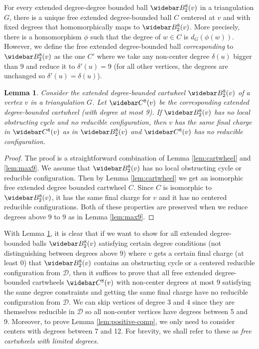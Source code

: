 \documentclass[10pt,a4paper]{article}
\newtheorem{lem}[thm]{Lemma}
\renewcommand{\bar}{\widebar}
\def\cD{{\mathcal D}}
\def\showlabel#1{}
\begin{document}
For every extended degree-degree bounded ball $\bar B^8_2(v)$ in a triangulation $G$, there is a unique free extended degree-bounded ball $C$ centered at $v$ and with fixed degrees that homomorphically maps to $\bar B^8_2(v)$. More precisely, there is a homomorphism $\phi$ such that the degree of $w\in C$ is $d_G(\phi(w))$. However, we define the free extended degree-bounded ball \emph{corresponding} to $\bar B^8_2(v)$ as the one $C'$ where we take any non-center degree $\delta(u)$ bigger than 9 and reduce it to $\delta'(u)=9$ (for all other vertices, the degrees are unchanged so $\delta'(u)=\delta(u)$).
\begin{lem}\label{lem:cartwheel-x}\showlabel{lem:cartwheel-x}
Consider the extended degree-bounded cartwheel $\bar B^8_2(v)$ of a vertex $v$ in a triangulation $G$. Let $\bar C^8(v)$ be the corresponding extended degree-bounded cartwheel
(with degree at most 9).
If $\bar B^8_2(v)$ has no local obstructing cycle and no reducible configuration, then 
$v$ has the same final charge in $\bar C^8(v)$ as in $\bar B^8_2(v)$ and $\bar C^8(v)$ has no reducible
configuration.
\end{lem}
\begin{proof}
The proof is a straightforward combination of Lemma \ref{lem:cartwheel} and \ref{lem:max9}. We assume that $\bar B^8_2(v)$ has no local obstructing cycle or reducible configuration.
Then by Lemma \ref{lem:cartwheel} we get an isomorphic free extended degree bounded 
cartwheel $C$. Since $C$ is isomorphic to $\bar B^8_2(v)$, it has the same final charge for $v$ and it has no centered reducible configurations. Both of these properties are preserved when we reduce degrees above $9$ to $9$ as in Lemma \ref{lem:max9}.
\end{proof}
With Lemma \ref{lem:cartwheel-x}, it is clear that if we want to show for all  extended degree-bounded balls $\bar B^8_2(v)$ satisfying certain degree conditions (not distinguishing between degrees above 9)
where $v$ gets a certain final charge (at least 0) that $\bar B^8_2(v)$ contains an obstructing cycle or a centered reducible configuration from $\cD$,
then it suffices to prove that all free extended degree-bounded cartwheels $\bar C^8(v)$ with non-center degrees at most 9 satisfying the same degree constraints and getting the same final charge have no
reducible configuration from $\cD$.
We can skip vertices of degree 3 and 4 
since they are themselves reducible in $\cD$ so all non-center vertices have degrees between 5 and 9. Moreover, to prove Lemma \ref{lem:positive-comp}, we only need to consider centers with degrees between 7 and 12. For brevity, we shall refer to these as \emph{free cartwheels with limited degrees.}
\end{document}
